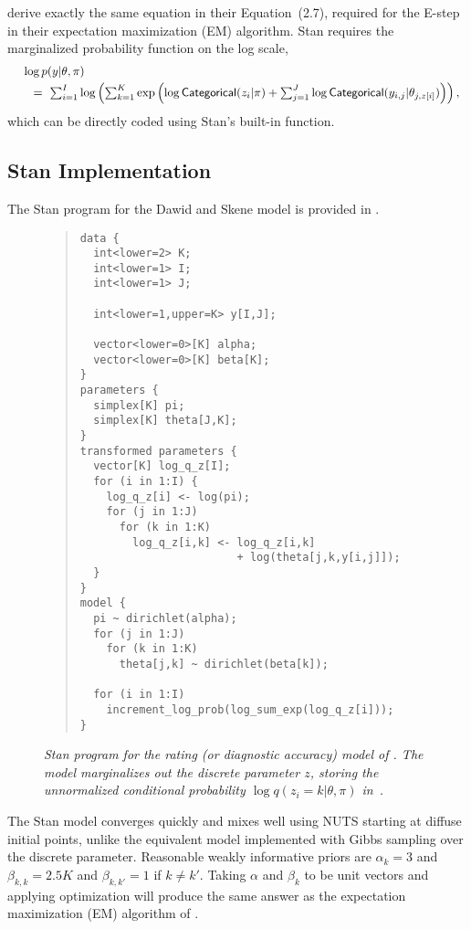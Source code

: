 \cite{DawidSkene:1979} derive exactly the same equation in their
Equation~(2.7), required for the E-step in their expectation
maximization (EM) algorithm.  Stan requires the marginalized
probability function on the log scale,
\[
\begin{array}{l}
\mbox{ } \ \log p(y | \theta, \pi)
\\[3pt]
\mbox{ } \ \ \ = \
\sum_{i=1}^I \log \left( \sum_{k=1}^K \exp
  \left( \log \mbox{\sf Categorical}(z_i | \pi)
         + \sum_{j=1}^J
         \log \mbox{\sf Categorical}(y_{i,j}|\theta_{j,z[i]})
  \right) \right),
\end{array}
\]                            
which can be directly coded using Stan's built-in 
function.


\subsection{Stan Implementation}

The Stan program for the Dawid and Skene model is provided in
.
%
\begin{figure}
\begin{quote}\small
\begin{Verbatim}
data {
  int<lower=2> K;
  int<lower=1> I;
  int<lower=1> J;

  int<lower=1,upper=K> y[I,J];

  vector<lower=0>[K] alpha;
  vector<lower=0>[K] beta[K];
}
parameters {
  simplex[K] pi;
  simplex[K] theta[J,K];
}
transformed parameters {
  vector[K] log_q_z[I];
  for (i in 1:I) {
    log_q_z[i] <- log(pi);
    for (j in 1:J)
      for (k in 1:K)
        log_q_z[i,k] <- log_q_z[i,k] 
                        + log(theta[j,k,y[i,j]]);
  }
}
model {
  pi ~ dirichlet(alpha);
  for (j in 1:J)
    for (k in 1:K)
      theta[j,k] ~ dirichlet(beta[k]);

  for (i in 1:I)
    increment_log_prob(log_sum_exp(log_q_z[i]));
}
\end{Verbatim}
\end{quote}
\vspace*{-12pt}
\caption{\small\it Stan program for the rating (or diagnostic
  accuracy) model of \cite{DawidSkene:1979}. The model marginalizes
  out the discrete parameter $z$, storing the unnormalized conditional
  probability $\log q(z_i=k|\theta,\pi)$ in\ \code{log\_q\_z[i,k]}.}%
\label{dawid-skene-model.figure}
\end{figure}
%
The Stan model converges quickly and mixes well using NUTS starting at
diffuse initial points, unlike the equivalent model implemented with
Gibbs sampling over the discrete parameter.  Reasonable weakly
informative priors are $\alpha_k = 3$ and $\beta_{k,k} = 2.5 K$ and
$\beta_{k,k'} = 1$ if $k \neq k'$.  Taking $\alpha$ and $\beta_k$ to
be unit vectors and applying optimization will produce the same answer
as the expectation maximization (EM) algorithm of
\cite{DawidSkene:1979}.  

